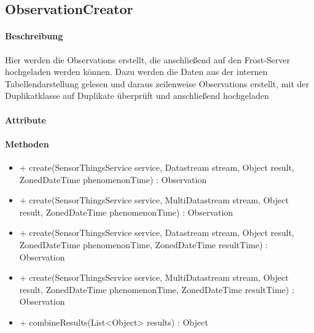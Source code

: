 
\subsection{ObservationCreator}

\paragraph{Beschreibung}
Hier werden die Observations erstellt, die anschließend auf den Frost-Server hochgeladen werden können.
Dazu werden die Daten aus der internen Tabellendarstellung gelesen und daraus zeilenweise Observations erstellt, mit der Duplikatklasse auf Duplikate überprüft und anschließend hochgeladen

\paragraph{Attribute}
\paragraph{Methoden}

\begin{itemize}
\item + create(SensorThingsService service, Datastream stream, Object result, ZonedDateTime phenomenonTime) : Observation
\item + create(SensorThingsService service, MultiDatastream stream, Object result, ZonedDateTime phenomenonTime) : Observation
\item + create(SensorThingsService service, Datastream stream, Object result, ZonedDateTime phenomenonTime, ZonedDateTime resultTime) : Observation
\item + create(SensorThingsService service, MultiDatastream stream, Object result, ZonedDateTime phenomenonTime, ZonedDateTime resultTime) : Observation
\item + combineResults(List<Object> results) : Object
\end{itemize}